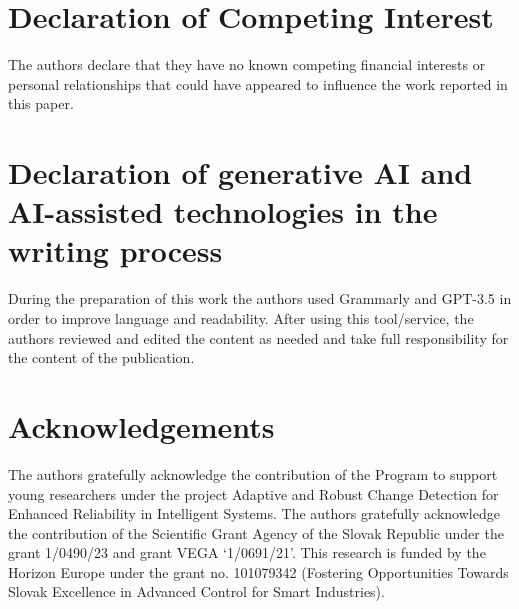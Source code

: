 \documentclass[preprint,12pt,authoryear]{elsarticle}
\begin{document}
\section*{Declaration of Competing Interest}
The authors declare that they have no known competing financial interests or personal relationships that could have appeared to influence the work reported in this paper.

\section*{Declaration of generative AI and AI-assisted technologies in the writing process}
During the preparation of this work the authors used Grammarly and GPT-3.5 in order to improve language and readability. After using this tool/service, the authors reviewed and edited the content as needed and take full responsibility for the content of the publication.

\section*{Acknowledgements}
The authors gratefully acknowledge the contribution of the Program to support young researchers under the project Adaptive and Robust Change Detection for Enhanced Reliability in Intelligent Systems. The authors gratefully acknowledge the contribution of the Scientific Grant Agency of the Slovak Republic under the grant 1/0490/23 and grant VEGA `1/0691/21'. This research is funded by the Horizon Europe under the grant no. 101079342 (Fostering Opportunities Towards Slovak Excellence in Advanced Control for Smart Industries).



\end{document}
